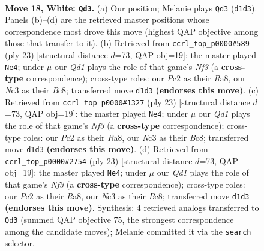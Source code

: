 \documentclass[11pt]{article}
\begin{document}
\clearpage

\begin{figure}[p]\centering
\begin{subfigure}{0.46\textwidth}\centering
\resizebox{\linewidth}{!}{%
\newchessgame
\chessboard[
  setfen={r1bq1rk1/1p1n3p/n1p1pp2/p2p4/3P1P2/2N2N2/PPP2KPP/2RQ1B1R w - - 0 18},
  showmover=false,
  pgfstyle=straightmove, color=movearrow, markmove={d1-d3}
]}
\caption{}
\end{subfigure}\hfill
\begin{subfigure}{0.46\textwidth}\centering
\resizebox{\linewidth}{!}{%
\newchessgame
\chessboard[
  setfen={r1bqr1k1/pp3pp1/2n2n1p/2Pp4/8/P1PBPN1P/5PP1/R1BQ1RK1 b - - 0 12},
  showmover=false,
  pgfstyle=straightmove, color=movearrow, markmove={f6-e4}
]}
\caption{}
\end{subfigure}
\\[4pt]
\begin{subfigure}{0.46\textwidth}\centering
\resizebox{\linewidth}{!}{%
\newchessgame
\chessboard[
  setfen={r1bqr1k1/pp3pp1/2n2n1p/2Pp4/8/P1PBPN1P/5PP1/R1BQ1RK1 b - - 0 12},
  showmover=false,
  pgfstyle=straightmove, color=movearrow, markmove={f6-e4}
]}
\caption{}
\end{subfigure}\hfill
\begin{subfigure}{0.46\textwidth}\centering
\resizebox{\linewidth}{!}{%
\newchessgame
\chessboard[
  setfen={r1bqr1k1/pp3pp1/2n2n1p/2Pp4/8/P1PBPN1P/5PP1/R1BQ1RK1 b - - 0 12},
  showmover=false,
  pgfstyle=straightmove, color=movearrow, markmove={f6-e4}
]}
\caption{}
\end{subfigure}
\caption{\textbf{Move 18, White: \texttt{Qd3}.} (a) Our position; Melanie plays \texttt{Qd3} (\texttt{d1d3}). Panels (b)--(d) are the retrieved master positions whose correspondence most drove this move (highest QAP objective among those that transfer to it). (b) Retrieved from \texttt{ccrl\_top\_p0000\#589} (ply 23) [structural distance $d$=73, QAP obj=19]: the master played \texttt{Ne4}; under $\mu$ our \emph{Qd1} plays the role of that game's \emph{Nf3} (a \textbf{cross-type} correspondence); cross-type roles: our \emph{P}c2 as their \emph{R}a8, our \emph{N}c3 as their \emph{B}c8; transferred move \texttt{d1d3} \textbf{(endorses this move)}. (c) Retrieved from \texttt{ccrl\_top\_p0000\#1327} (ply 23) [structural distance $d$=73, QAP obj=19]: the master played \texttt{Ne4}; under $\mu$ our \emph{Qd1} plays the role of that game's \emph{Nf3} (a \textbf{cross-type} correspondence); cross-type roles: our \emph{P}c2 as their \emph{R}a8, our \emph{N}c3 as their \emph{B}c8; transferred move \texttt{d1d3} \textbf{(endorses this move)}. (d) Retrieved from \texttt{ccrl\_top\_p0000\#2754} (ply 23) [structural distance $d$=73, QAP obj=19]: the master played \texttt{Ne4}; under $\mu$ our \emph{Qd1} plays the role of that game's \emph{Nf3} (a \textbf{cross-type} correspondence); cross-type roles: our \emph{P}c2 as their \emph{R}a8, our \emph{N}c3 as their \emph{B}c8; transferred move \texttt{d1d3} \textbf{(endorses this move)}. Synthesis: 4 retrieved analogs transferred to \texttt{Qd3} (summed QAP objective 75, the strongest correspondence among the candidate moves); Melanie committed it via the \texttt{search} selector.}
\label{fig:thought-m34}
\end{figure}
\end{document}
